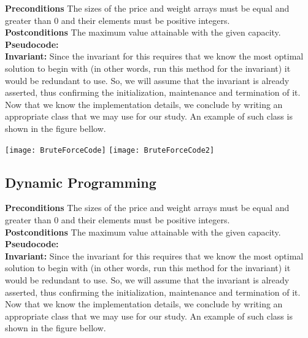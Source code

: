 \documentclass[12pt]{article}
\begin{document}
\textbf{Preconditions} The sizes of the price and weight arrays must be equal and greater than 0 and their elements must be positive integers. \\

\textbf{Postconditions} The maximum value attainable with the given capacity.\\

\textbf{Pseudocode:} \\



\textbf{Invariant:} Since the invariant for this requires that we know the most optimal solution to begin with (in other words, run this method for the invariant) it would be redundant to use. So,  we will assume that the invariant is already asserted, thus confirming the initialization, maintenance and termination of it.\\

Now that we know the implementation details, we conclude by writing an appropriate class that we may use for our study. An example of such class is shown in the figure bellow.

\texttt{[image: BruteForceCode]}
\texttt{[image: BruteForceCode2]}
\subsection*{Dynamic Programming}

\textbf{Preconditions} The sizes of the price and weight arrays must be equal and greater than 0 and their elements must be positive integers. \\

\textbf{Postconditions} The maximum value attainable with the given capacity.\\

\textbf{Pseudocode:} \\

\textbf{Invariant:} Since the invariant for this requires that we know the most optimal solution to begin with (in other words, run this method for the invariant) it would be redundant to use. So,  we will assume that the invariant is already asserted, thus confirming the initialization, maintenance and termination of it.\\

Now that we know the implementation details, we conclude by writing an appropriate class that we may use for our study. An example of such class is shown in the figure bellow.
\end{document}
